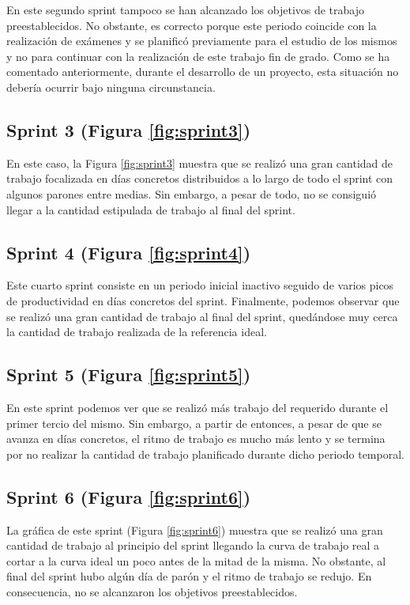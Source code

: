 En este segundo sprint tampoco se han alcanzado los objetivos de trabajo preestablecidos. No obstante, es correcto porque este periodo coincide con la realización de exámenes y se planificó previamente para el estudio de los mismos y no para continuar con la realización de este trabajo fin de grado. Como se ha comentado anteriormente, durante el desarrollo de un proyecto, esta situación no debería ocurrir bajo ninguna circunstancia.

\subsection{Sprint 3 (Figura \ref{fig:sprint3})}

En este caso, la Figura \ref{fig:sprint3} muestra que se realizó una gran cantidad de trabajo focalizada en días concretos distribuidos a lo largo de todo el sprint con algunos parones entre medias. Sin embargo, a pesar de todo, no se consiguió llegar a la cantidad estipulada de trabajo al final del sprint.

\subsection{Sprint 4 (Figura \ref{fig:sprint4})}

Este cuarto sprint consiste en un periodo inicial inactivo seguido de varios picos de productividad en días concretos del sprint. Finalmente, podemos observar que se realizó una gran cantidad de trabajo al final del sprint, quedándose muy cerca la cantidad de trabajo realizada de la referencia ideal.

\subsection{Sprint 5 (Figura \ref{fig:sprint5})}

En este sprint podemos ver que se realizó más trabajo del requerido durante el primer tercio del mismo. Sin embargo, a partir de entonces, a pesar de que se avanza en días concretos, el ritmo de trabajo es mucho más lento y se termina por no realizar la cantidad de trabajo planificado durante dicho periodo temporal.

\subsection{Sprint 6 (Figura \ref{fig:sprint6})}

La gráfica de este sprint (Figura \ref{fig:sprint6}) muestra que se realizó una gran cantidad de trabajo al principio del sprint llegando la curva de trabajo real a cortar a la curva ideal un poco antes de la mitad de la misma. No obstante, al final del sprint hubo algún día de parón y el ritmo de trabajo se redujo. En consecuencia, no se alcanzaron los objetivos preestablecidos.


